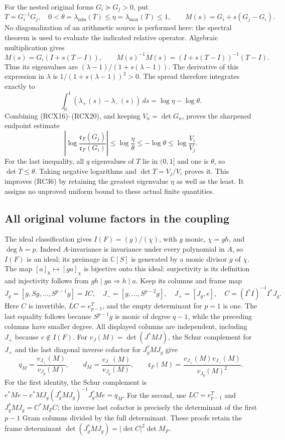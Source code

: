 \documentclass{article}
\begin{document}
For the nested original forms \(G_i\succeq G_j>0\), put
\[
 T=G_i^{-1}G_j,\quad
 0<\theta=\lambda_{\min}(T)\le
 \eta=\lambda_{\max}(T)\le1,\qquad
 M(s)=G_i+s(G_j-G_i).
 \tag{RCX18}
\]
No diagonalization of an arithmetic source is performed here:
the spectral theorem is used to evaluate the indicated relative
operator. Algebraic multiplication gives
\[
 M(s)=G_i(I+s(T-I)),\qquad
 M(s)^{-1}\dot M(s)=(I+s(T-I))^{-1}(T-I).
 \tag{RCX19}
\]
Thus its eigenvalues are
\((\lambda-1)/(1+s(\lambda-1))\). The derivative of this expression
in \(\lambda\) is \(1/(1+s(\lambda-1))^2>0\).
The spread therefore integrates exactly to
\[
 \int_0^1(\lambda_+(s)-\lambda_-(s))\,ds
   =\log\eta-\log\theta.
 \tag{RCX20}
\]
Combining (RCX16)--(RCX20), and keeping \(V_n=\det G_n\), proves
the sharpened endpoint estimate
\[
 \boxed{
 \left|\log\frac{\mathfrak c_F(G_j)}{\mathfrak c_F(G_i)}\right|
 \le\log\frac{\eta}{\theta}
 \le-\log\theta
 \le\log\frac{V_i}{V_j}.}
 \tag{RCX21}
\]
For the last inequality, all \(q\) eigenvalues of \(T\) lie in
\((0,1]\) and one is \(\theta\), so
\(\det T\le\theta\). Taking negative logarithms and
\(\det T=V_j/V_i\) proves it. This improves (RC36) by retaining
the greatest eigenvalue \(\eta\) as well as the least. It assigns
no unproved uniform bound to these actual finite quantities.

\subsection{All original volume factors in the coupling}

The ideal classification gives \(I(F)=(g)/(\chi)\), with \(g\) monic,
\(\chi=gh\), and \(\deg h=p\). Indeed \(A\)-invariance is invariance
under every polynomial in \(A\), so \(I(F)\) is an ideal; its preimage
in \(\mathbb C[S]\) is generated by a monic divisor \(g\) of \(\chi\).
The map \([a]_h\mapsto[ga]_\chi\) is bijective onto this ideal:
surjectivity is its definition and injectivity follows from
\(gh\mid ga\Rightarrow h\mid a\). Keep its columns and frame map
\[
 J_g=[g,Sg,\ldots,S^{p-1}g]=IC,\quad
 J_-=[g,\ldots,S^{p-2}g],\quad J_+=[J_g,e],\quad
 C=(I^*I)^{-1}I^*J_g.
 \tag{RCX22}
\]
Here \(C\) is invertible, \(LC=e_{p-1}^T\), and the empty
determinant for \(p=1\) is one. The last equality follows because
\(S^{p-1}g\) is monic of degree \(q-1\), while the preceding
columns have smaller degree. All displayed columns are independent,
including \(J_+\) because \(e\notin I(F)\).
For \(v_J(M)=\det(J^*MJ)\), the Schur complement for \(J_+\)
and the last diagonal inverse cofactor for \(J_g^*MJ_g\) give
\[
 q_M=\frac{v_{J_+}(M)}{v_{J_g}(M)},\qquad
 d_M=\frac{v_{J_-}(M)}{v_{J_g}(M)},\qquad
 \mathfrak c_F(M)=
       \frac{v_{J_+}(M)v_{J_-}(M)}{v_{J_g}(M)^2}.
 \tag{RCX23}
\]
For the first identity, the Schur complement is
\(e^*Me-e^*MJ_g(J_g^*MJ_g)^{-1}J_g^*Me=q_M\).
For the second, use \(LC=e_{p-1}^T\) and
\(J_g^*MJ_g=C^*M_FC\); the inverse last cofactor is precisely
the determinant of the first \(p-1\) Gram columns divided by the
full determinant. These proofs retain the frame determinant
\(\det(J_g^*MJ_g)=|\det C|^2\det M_F\).
\end{document}
